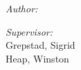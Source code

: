 \begin{titlepage}
	\begin{minipage}{0.4\textwidth}
		\begin{flushleft} \large
			\emph{Author:}\\
			\textrm{\theauthor}
		\end{flushleft}
	\end{minipage}
	\begin{minipage}{0.4\textwidth}
		\begin{flushright} \large
			\emph{Supervisor:} \\
			\textrm{Grepstad, Sigrid}\\  %
			\textrm{Heap, Winston} %
		\end{flushright}
	\end{minipage}\\[2 cm]
	
	{\large \thedate}\\[2 cm]
 
	\vfill
	
\end{titlepage}